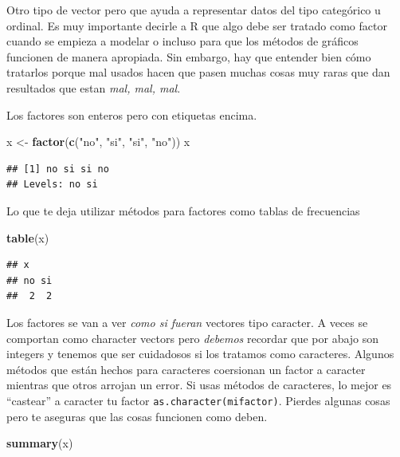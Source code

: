 \documentclass[]{article}
\newenvironment{Shaded}{\begin{snugshade}}{\end{snugshade}}
\newcommand{\KeywordTok}[1]{\textcolor[rgb]{0.13,0.29,0.53}{\textbf{{#1}}}}
\newcommand{\StringTok}[1]{\textcolor[rgb]{0.31,0.60,0.02}{{#1}}}
\newcommand{\NormalTok}[1]{{#1}}
\begin{document}
Otro tipo de vector pero que ayuda a representar datos del tipo
categórico u ordinal. Es muy importante decirle a R que algo debe ser
tratado como factor cuando se empieza a modelar o incluso para que los
métodos de gráficos funcionen de manera apropiada. Sin embargo, hay que
entender bien cómo tratarlos porque mal usados hacen que pasen muchas
cosas muy raras que dan resultados que estan \emph{mal, mal, mal}.

Los factores son enteros pero con etiquetas encima.

\begin{Shaded}
\begin{Highlighting}[]
\NormalTok{x <-}\StringTok{ }\KeywordTok{factor}\NormalTok{(}\KeywordTok{c}\NormalTok{(}\StringTok{"no"}\NormalTok{, }\StringTok{"si"}\NormalTok{, }\StringTok{"si"}\NormalTok{, }\StringTok{"no"}\NormalTok{))}
\NormalTok{x}
\end{Highlighting}
\end{Shaded}

\begin{verbatim}
## [1] no si si no
## Levels: no si
\end{verbatim}

Lo que te deja utilizar métodos para factores como tablas de frecuencias

\begin{Shaded}
\begin{Highlighting}[]
\KeywordTok{table}\NormalTok{(x)}
\end{Highlighting}
\end{Shaded}

\begin{verbatim}
## x
## no si 
##  2  2
\end{verbatim}

Los factores se van a ver \emph{como si fueran} vectores tipo caracter.
A veces se comportan como character vectors pero \emph{debemos} recordar
que por abajo son integers y tenemos que ser cuidadosos si los tratamos
como caracteres. Algunos métodos que están hechos para caracteres
coersionan un factor a caracter mientras que otros arrojan un error. Si
usas métodos de caracteres, lo mejor es ``castear'' a caracter tu factor
\texttt{as.character(mifactor)}. Pierdes algunas cosas pero te aseguras
que las cosas funcionen como deben.

\begin{Shaded}
\begin{Highlighting}[]
\KeywordTok{summary}\NormalTok{(x)}
\end{Highlighting}
\end{Shaded}
\end{document}

